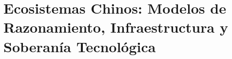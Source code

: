 
\section[Ecosistemas Chinos]{Ecosistemas Chinos: Modelos de Razonamiento, Infraestructura y Soberanía Tecnológica}

